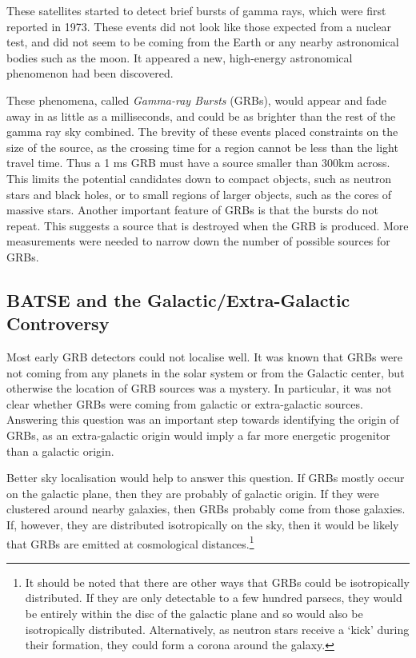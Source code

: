 \documentclass[11pt]{cuthesis}
\begin{document}
These satellites started to detect brief bursts of gamma rays, which were first reported in 1973. These events did not look like those expected from a nuclear test, and did not seem to be coming from the Earth or any nearby astronomical bodies such as the moon. It appeared a new, high-energy astronomical phenomenon had been discovered. 

These phenomena, called \textit{Gamma-ray Bursts} (GRBs), would appear and fade away in as little as a milliseconds, and could be as brighter than the rest of the gamma ray sky combined. The brevity of these events placed constraints on the size of the source, as the crossing time for a region cannot be less than the light travel time. Thus a 1 ms GRB must have a source smaller than 300km across. This limits the potential candidates down to compact objects, such as neutron stars and black holes, or to small regions of larger objects, such as the cores of massive stars. Another important feature of GRBs is that the bursts do not repeat. This suggests a source that is destroyed when the GRB is produced. More measurements were needed to narrow down the number of possible sources for GRBs. 

\subsection{BATSE and the Galactic/Extra-Galactic Controversy}
Most early GRB detectors could not localise well. It was known that GRBs were not coming from any planets in the solar system or from the Galactic center, but otherwise the location of GRB sources was a mystery. In particular, it was not clear whether GRBs were coming from galactic or extra-galactic sources. Answering this question was an important step towards identifying the origin of GRBs, as an extra-galactic origin would imply a far more energetic progenitor than a galactic origin. 

Better sky localisation would help to answer this question. If GRBs mostly occur on the galactic plane, then they are probably of galactic origin. If they were clustered around nearby galaxies, then GRBs probably come from those galaxies. If, however, they are distributed isotropically on the sky, then it would be likely that GRBs are emitted at cosmological distances.\footnote{It should be noted that there are other ways that GRBs could be isotropically distributed. If they are only detectable to a few hundred parsecs, they would be entirely within the disc of the galactic plane and so would also be isotropically distributed. Alternatively, as neutron stars receive a `kick' during their formation, they could form a corona around the galaxy.}
\end{document}
